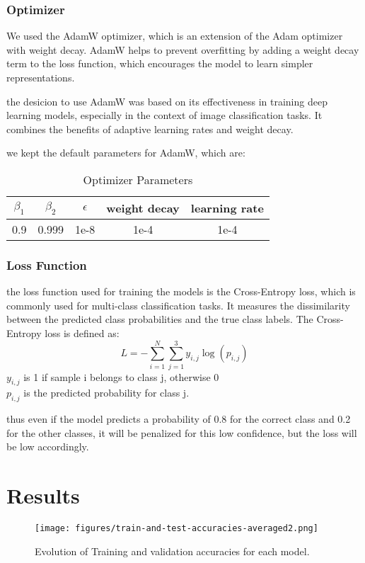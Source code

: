 \documentclass[twocolumn,superscriptaddress,aps]{revtex4-1}
\begin{document}
\subsubsection{Optimizer}
We used the AdamW optimizer, which is an extension of the Adam optimizer with weight decay. AdamW helps to prevent overfitting by adding a weight decay term to the loss function, which encourages the model to learn simpler representations.

the desicion to use AdamW was based on its effectiveness in training deep learning models, especially in the context of image classification tasks. It combines the benefits of adaptive learning rates and weight decay.

we kept the default parameters for AdamW, which are:
\begin{table}[h]
    \centering
    \begin{tabular}{|c|c|c|c|c|}
        \hline
        $\beta_1$ & $\beta_2$ & $\epsilon$ & weight decay & learning rate \\
        \hline
        0.9 & 0.999 & 1e-8 & 1e-4 & 1e-4 \\
        \hline
    \end{tabular}
    \caption{Optimizer Parameters}
    \label{tab:optimizer_params}
\end{table}

\subsubsection{Loss Function}
the loss function used for training the models is the Cross-Entropy loss, which is commonly used for multi-class classification tasks. It measures the dissimilarity between the predicted class probabilities and the true class labels.
The Cross-Entropy loss is defined as:
\[
L = - \sum_{i=1}^{N} \sum_{j=1}^{3} y_{i,j} \log(p_{i,j})
\]
$y_{i,j}$ is 1 if sample i belongs to class j, otherwise 0\\
$p_{i,j}$ is the predicted probability for class j.

thus even if the model predicts a probability of 0.8 for the correct class and 0.2 for the other classes, it will be penalized for this low confidence, but the loss will be low accordingly.


\section{Results}

\begin{figure*}[ht]
  \centering
  \texttt{[image: figures/train-and-test-accuracies-averaged2.png]}
  \caption{Evolution of Training and validation accuracies for each model.}
  \label{fig:train-val-acc}
\end{figure*}
\end{document}
